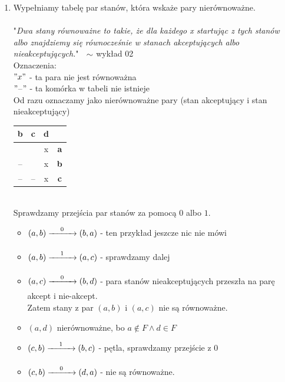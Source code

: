 \documentclass[12pt]{article}
\begin{document}
\begin{enumerate}
    \item Wypełniamy tabelę par stanów, która wskaże pary nierównoważne.\\\\
    "\emph{Dwa stany równoważne to takie,
    że dla każdego x startując z tych stanów albo znajdziemy się 
    równocześnie w stanach akceptujących albo nieakceptujących.}"  $\hspace*{0.2cm}\sim$ wykład 02
    \\Oznaczenia:\\
    $"x"$ - ta para nie jest równoważna\\
    $"$--$"$ - ta komórka w tabeli nie istnieje
    \\Od razu oznaczamy jako nierównoważne pary (stan akceptujący i stan nieakceptujący)
    \begin{table}[h]
        \label{dupa}
        \centering
        \begin{tabular}{c|c|c|c}
            \textbf{b}  & \textbf{c} & \textbf{d} & \\
            \hline
             &  & x & \textbf{a}\\
            \hline
            -- &  & x & \textbf{b}\\
            \hline
            -- & -- & x & \textbf{c}\\
        \end{tabular} 
    \end{table}
    \\Sprawdzamy przejścia par stanów za pomocą $0$ albo $1$.
    
    \begin{itemize}
        \item $(a,b) \xrightarrow[\text{\hspace*{1cm}}]{\text{0}} (b,a)$ - ten przykład jeszcze nic nie mówi
        \item $(a,b) \xrightarrow[\text{\hspace*{1cm}}]{\text{1}} (a,c)$ - sprawdzamy dalej 
        \item $(a,c) \xrightarrow[\text{\hspace*{1cm}}]{\text{0}} (b,d)$ - para stanów nieakceptujących przeszła na parę akcept i nie-akcept.
        \\Zatem stany z par $(a,b)$ i $(a,c)$ nie są równoważne.
        \item $(a,d)$ nierównoważne, bo $a \notin F \land d \in F$
        \item $(c,b) \xrightarrow[\text{\hspace*{1cm}}]{\text{1}} (b,c)$ - pętla, sprawdzamy przejście z $0$
        \item $(c,b) \xrightarrow[\text{\hspace*{1cm}}]{\text{0}} (d,a)$ - nie są równoważne.
    \end{itemize}


\end{enumerate}
\end{document}
